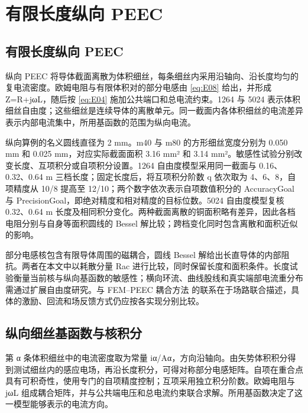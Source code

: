 \section{有限长度纵向 PEEC}
\label{chapter:06}

\hypertarget{06.peec_method.heading}{}
\subsection{有限长度纵向 PEEC}

\hypertarget{06.peec_method.p1}{}
纵向 PEEC 将导体截面离散为体积细丝，每条细丝内采用沿轴向、沿长度均匀的复电流密度。欧姆电阻与有限体积对的部分电感由 \eqref{eq:E08} 给出，并形成 Z=R+jωL，随后按 \eqref{eq:E04} 施加公共端口和总电流约束。1264 与 5024 表示体积细丝自由度；这些细丝是连续导体的离散单元。同一截面内各体积细丝的电流差异表示内部电流集中，所用基函数的范围为纵向电流。

\hypertarget{06.peec_method.p2}{}
纵向算例的名义圆线直径为 2 mm。m40 与 m80 的方形细丝宽度分别为 0.050 mm 和 0.025 mm，对应实际截面面积 3.16 mm² 和 3.14 mm²。敏感性试验分别改变长度、互项积分或自项积分设置。1264 自由度模型采用同一截面与 0.16、0.32、0.64 m 三档长度；固定长度后，将互项积分阶数 q 依次取为 4、6、8，自项精度从 10/8 提高至 12/10；两个数字依次表示自项数值积分的 AccuracyGoal 与 PrecisionGoal，即绝对精度和相对精度的目标位数。5024 自由度模型复核 0.32、0.64 m 长度及相同积分变化。两种截面离散的铜面积略有差异，因此各档电阻分别与自身等面积圆线的 Bessel 解比较；跨档变化同时包含离散和面积近似的影响。

\hypertarget{06.peec_method.p3}{}
部分电感核包含有限导体周围的磁耦合，圆线 Bessel 解给出长直导体的内部阻抗。两者在本文中以耗散分量 Rac 进行比较，同时保留长度和面积条件。长度试验衡量当前核与纵向基函数的敏感性；横向环流、曲线股线和真实端部电流重分布需通过扩展自由度研究。与 FEM–PEEC 耦合方法 \cite{P03} 的联系在于场路联合描述，具体的激励、回流和场反馈方式仍应按各实现分别比较。

\hypertarget{06.peec_derivation.heading}{}
\subsection{纵向细丝基函数与核积分}

\hypertarget{06.peec_derivation.p1}{}
第 α 条体积细丝中的电流密度取为常量 iα/Aα，方向沿轴向。由矢势体积积分得到测试细丝内的感应电场，再沿长度积分，可得对称部分电感矩阵。自项在重合点具有可积奇性，使用专门的自项精度控制；互项采用独立积分阶数。欧姆电阻与 jωL 组成耦合矩阵，并与公共端电压和总电流约束联合求解。所用基函数决定了这一模型能够表示的电流方向。

